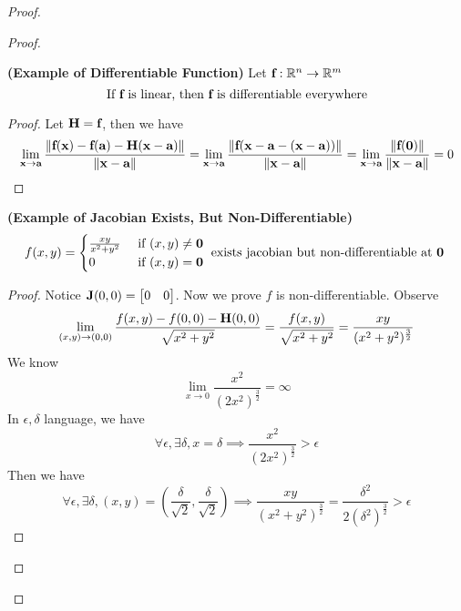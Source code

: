 \documentclass{report}
\begin{document}
\begin{proof}
\begin{proof}
\begin{theorem}
\label{5.3.2}
\textbf{(Example of Differentiable Function)} Let $\textbf{f}:\mathbb{R}^n\rightarrow \mathbb{R}^m$ 
\begin{equation}
\text{ If $\textbf{f}$ is linear, then $\textbf{f}$ is differentiable everywhere }
\end{equation}
\end{theorem}
\begin{proof}
Let $\textbf{H}=\textbf{f}$, then we have 
\begin{equation}
  \lim_{\textbf{x}\to \textbf{a}}\frac{\| \textbf{f}(\textbf{x})-\textbf{f}(\textbf{a})-\textbf{H}(\textbf{x}-\textbf{a}) \|}{\| \textbf{x}-\textbf{a} \|}=\lim_{\textbf{x}\to \textbf{a}}\frac{\| \textbf{f}(\textbf{x}-\textbf{a}-(\textbf{x}-\textbf{a})) \|}{\| \textbf{x}-\textbf{a} \|}=\lim_{\textbf{x}\to \textbf{a}}\frac{\| \textbf{f}(\textbf{0}) \|}{\| \textbf{x}-\textbf{a} \|}=0
\end{equation}
\end{proof}
\begin{theorem}
\label{5.3.3}
\textbf{(Example of Jacobian Exists, But Non-Differentiable)} 
\begin{equation}
f(x,y)=\begin{cases}
  \frac{xy}{x^2+y^2}& \text{ if  }(x,y)\neq \textbf{0}\\
  0& \text{ if  }(x,y)=\textbf{0}
\end{cases}\text{ exists jacobian but non-differentiable at $\textbf{0}$  }
\end{equation}
\end{theorem}
\begin{proof}
Notice $\textbf{J}(0,0)=\begin{bmatrix}
  0&0
\end{bmatrix}$. Now we prove $f$ is non-differentiable. Observe
\begin{equation}
\lim_{(x,y)\to (0,0)}\frac{f(x,y)-f(0,0)-\textbf{H}(0,0)}{\sqrt{x^2+y^2} }=\frac{f(x,y)}{\sqrt{x^2+y^2} }=\frac{xy}{(x^2+y^2)^{\frac{3}{2}}}
\end{equation}
We know 
\begin{equation}
\lim_{x\to 0}\frac{x^2}{(2x^2)^{\frac{3}{2}}}=\infty
\end{equation}
In $\epsilon,\delta$ language, we have
\begin{equation}
\forall \epsilon, \exists \delta, x=\delta\implies  \frac{x^2}{(2x^2)^{\frac{3}{2}}}>\epsilon 
\end{equation}
Then we have 
\begin{equation}
  \forall \epsilon ,\exists \delta, (x,y)=(\frac{\delta}{\sqrt{2}},\frac{\delta}{\sqrt{2}}) \implies \frac{xy}{(x^2+y^2)^{\frac{3}{2}}}=\frac{\delta^2}{2(\delta^2)^{\frac{3}{2}}}>\epsilon 

\end{equation}
\end{proof}
\end{proof}
\end{proof}
\end{document}
